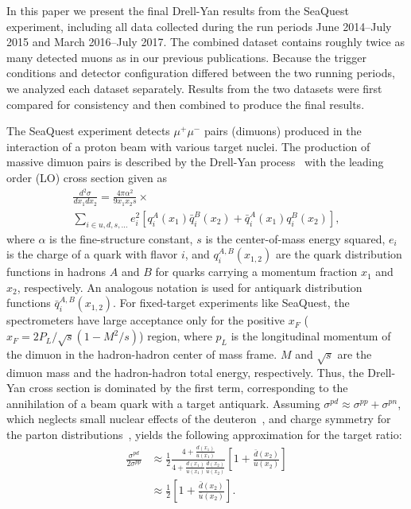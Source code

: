 \documentclass[reprint,aps,unsortedaddress,superscriptaddress,prl,floatfix,showpacs,linenumbers]{revtex4-2}
\begin{document}
In this paper we present the final Drell-Yan results from the SeaQuest experiment,
including all data collected during the run periods June 2014--July 2015 and March 2016--July 2017.
The combined dataset contains roughly twice as many detected muons as in our previous publications.
Because the trigger conditions and detector configuration differed between the two running periods,
we analyzed each dataset separately.
Results from the two datasets were first compared for consistency and then combined to produce the final results.

The SeaQuest experiment detects $\mu^+\mu^-$ pairs (dimuons) produced in
the interaction of a proton beam with various target nuclei. The production
of massive dimuon pairs is described by the Drell-Yan
process~\cite{drell1970} with the leading order (LO) cross section given as
\begin{multline}
	\frac{d^2\sigma}{dx_1dx_2}=\frac{4\pi \alpha^2}{9x_1x_2s} \times
	\label{eq:DYCross} \\
	\sum_{i\in u,d,s,\dots} e_i^2 \left[q_i^A\left(x_1\right) \bar q_i^B\left(x_2\right) + \bar q_i^A\left(x_1\right)
		q_i^B\left(x_2\right)\right],
\end{multline}
where $\alpha$ is the fine-structure constant,
$s$ is the center-of-mass energy squared,
$e_i$ is the charge of a quark
with flavor $i$, and $q_i^{A,B}\left(x_{1,2}\right)$ are the quark
distribution functions in hadrons $A$ and $B$
for quarks carrying a momentum fraction $x_1$ and $x_2$, respectively.
An analogous notation is used for antiquark distribution functions
$\bar q_i^{A,B}\left(x_{1,2}\right)$.
For fixed-target experiments like SeaQuest, the spectrometers have
large acceptance only for the positive $x_F$ ($x_F = 2P_L/\sqrt{s}\left(1-M^2/s\right)$) region,
where $p_L$ is the longitudinal momentum of the dimuon in the hadron-hadron center of mass frame.
$M$ and $\sqrt{s}$ are the dimuon mass and the hadron-hadron total energy, respectively.
Thus, the Drell-Yan cross section is dominated by
the first term, corresponding to the annihilation of a beam quark with
a target antiquark. Assuming
$\sigma^{pd} \approx \sigma^{pp} + \sigma^{pn}$,
which neglects small nuclear effects of the
deuteron~\cite{kumano1998,ehlers2014},
and charge symmetry for the parton distributions~\cite{londergan2010},
 yields the following approximation for the target ratio:
\begin{equation}
	\begin{split}
		\frac{\sigma^{pd}}{2\sigma^{pp}} & \approx
		\frac{1}{2} \frac{4+\frac{d\left(x_1\right)}
			{u\left(x_1\right)}}{4+\frac{d\left(x_1\right)}
			{u\left(x_1\right)}\frac{\bar d\left(x_2\right)}{\bar u\left(x_2\right)}}
		\left[1+\frac{\bar d\left(x_2\right)}{\bar u\left(x_2\right)}\right]                         \\
		                                 & \approx \frac{1}{2} \left[1+\frac{\bar d\left(x_2\right)}
			{\bar u\left(x_2\right)}\right].
	\end{split}
	\label{eq:crRatio}
\end{equation}
\end{document}
